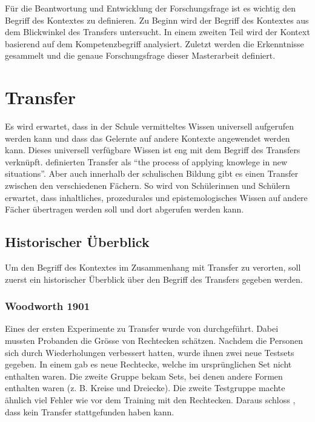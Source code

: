 

Für die Beantwortung und Entwicklung der Forschungsfrage ist es wichtig den Begriff des Kontextes zu definieren. Zu Beginn wird der Begriff des Kontextes aus dem Blickwinkel des Transfers untersucht. In einem zweiten Teil wird der Kontext basierend auf dem Kompetenzbegriff analysiert. Zuletzt werden die Erkenntnisse gesammelt und die genaue Forschungsfrage dieser Masterarbeit definiert.

\section{Transfer}

Es wird erwartet, dass in der Schule vermitteltes Wissen universell aufgerufen werden kann und dass das Gelernte auf andere Kontexte angewendet werden kann. Dieses universell verfügbare Wissen ist eng mit dem Begriff des Transfers verknüpft. \citet{Greeno1996} definierten Transfer als "`the process of applying knowlege in new situations"'. Aber auch innerhalb der schulischen Bildung gibt es einen Transfer zwischen den verschiedenen Fächern. So wird von Schülerinnen und Schülern erwartet, dass inhaltliches, prozedurales und epistemologisches Wissen auf andere Fächer übertragen werden soll und dort abgerufen werden kann.

\subsection{Historischer Überblick}
\label{sek:theorie}

Um den Begriff des Kontextes im Zusammenhang mit Transfer zu verorten, soll zuerst ein historischer Überblick über den Begriff des Transfers gegeben werden.


\subsubsection{Woodworth 1901}

Eines der ersten Experimente zu Transfer wurde von \citet{Woodworth1901} durchgeführt. Dabei mussten Probanden die Grösse von Rechtecken schätzen. Nachdem die Personen sich durch Wiederholungen verbessert hatten, wurde ihnen zwei neue Testsets gegeben. In einem gab es neue Rechtecke, welche im ursprünglichen Set nicht enthalten waren. Die zweite Gruppe bekam Sets, bei denen andere Formen enthalten waren (z. B. Kreise und Dreiecke). Die zweite Testgruppe machte ähnlich viel Fehler wie vor dem Training mit den Rechtecken. Daraus schloss \citeauthor{Woodworth1901}, dass kein Transfer stattgefunden haben kann.

